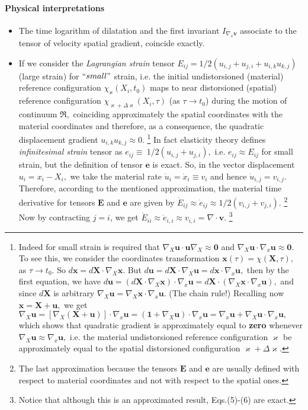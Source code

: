 \documentclass[12pt]{article}
\begin{document}
\paragraph{Physical interpretations}
\begin{itemize}
\item {The time logarithm of dilatation and the first  invariant $I_{\nabla_x\mathbf{v}}$ associate to the tensor of velocity spatial gradient, coincide exactly.} 
\item {If we consider the {\em Lagrangian strain} tensor $E_{ij}=1/2(u_{i,j}+u_{j,i}+u_{i,k}u_{k,j})$ (large strain) for $``small"$ strain, i.e. the initial undistorsioned (material) reference configuration $\chi_\varkappa(X_i,t_0)$ maps to  near distorsioned (spatial) reference configuration $\chi_{\varkappa+\Delta\varkappa}(X_i,\tau)$ (as $\tau\to t_0$) during the motion of continuum $\Re,$ coinciding approximately the spatial coordinates with the material coordinates and therefore, as a consequence, the quadratic displacement gradient $u_{i,k}u_{k,j}\approx 0.$ {\footnote{Indeed for small strain is required that $\nabla_X\mathbf{u}\cdot\mathbf{u}\nabla_X\approx\mathbf{0}$ and $\nabla_X\mathbf{u}\cdot\nabla_x\mathbf{u}\approx\mathbf{0}.$ To see this, we consider the coordinates transformation $\mathbf{x}(\tau)=\chi(\mathbf{X},\tau),$ as $\tau\to {t_0}.$ So $d\mathbf{x}=d\mathbf{X}\cdot\nabla_X\mathbf{x}.$ But $d\mathbf{u}=d\mathbf{X}\cdot\nabla_X\mathbf{u}=
d\mathbf{x}\cdot\nabla_x\mathbf{u},$  then by the first equation, we have $d\mathbf{u}=(d\mathbf{X}\cdot\nabla_X\mathbf{x})\cdot\nabla_x\mathbf{u}=
d\mathbf{X}\cdot (\nabla_X\mathbf{x}\cdot\nabla_x\mathbf{u}),$ and since $d\mathbf{X}$ is arbitrary $\nabla_X\mathbf{u}=\nabla_X\mathbf{x}\cdot\nabla_x\mathbf{u}.$ (The chain rule!) Recalling now $\mathbf{x}=\mathbf{X}+\mathbf{u},$ we get $\nabla_X\mathbf{u}=[\nabla_X(\mathbf{X}+\mathbf{u})]\cdot\nabla_x\mathbf{u}=
(\mathbf{1}+\nabla_X\mathbf{u})\cdot\nabla_x\mathbf{u}=
\nabla_x\mathbf{u}+\nabla_X\mathbf{u}\cdot\nabla_x\mathbf{u},$ which shows that quadratic gradient is approximately equal to {\bf zero} whenever $\nabla_X\mathbf{u}\approx\nabla_x\mathbf{u},$ i.e. the material undistorsioned reference configuration $\varkappa$ be approximately equal to the spatial distorsioned configuration $\varkappa+\Delta\varkappa.$}} In fact elasticity theory defines {\em infinitesimal strain} tensor as $e_{ij}\equiv\ 1/2(u_{i,j}+u_{j,i}),$ i.e. $e_{ij}\approx E_{ij}$ for small strain, but the definition of tensor $\mathbf{e}$ is exact. So, in the vector displacement $u_i=x_i-X_i,$ we take the material rate $\dot{u}_i=\dot{x}_i\equiv{v}_i$ and hence $\dot{u}_{i,j}=v_{i,j}.$ Therefore, according to the mentioned approximation, the material time derivative for tensors $\mathbf{E}$ and $\mathbf{e}$ are given by $\dot{E}_{ij}\approx \dot{e}_{ij}\approx 1/2(v_{i,j}+v_{j,i}).$ {\footnote{The last approximation because the tensors $\mathbf{E}$ and $\mathbf{e}$  are usually defined with respect to material coordinates and not with respect to the spatial ones.}} Now by contracting $j=i$, we get $\dot{E}_{ii}\approx\dot{e}_{i,i}\approx v_{i,i}=\nabla\cdot\mathbf{v}.$ {\footnote{Notice that although this is an approximated result, Eqs.(5)-(6) are exact.}}} 

\end{itemize}
\end{document}
